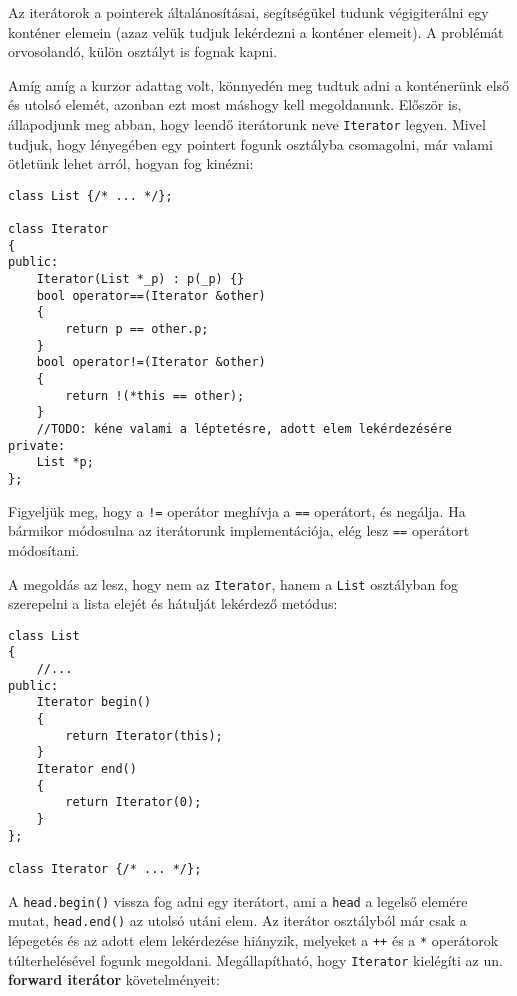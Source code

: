 \documentclass[../cpp_book/cpp_book.tex]{subfiles}
\begin{document}
	Az iterátorok a pointerek általánosításai, segítségükel tudunk végigiterálni egy konténer elemein (azaz velük tudjuk lekérdezni a konténer elemeit). A problémát orvosolandó, külön osztályt is fognak kapni.
	
	Amíg amíg a kurzor adattag volt, könnyedén meg tudtuk adni a konténerünk első és utolsó elemét, azonban ezt most máshogy kell megoldanunk. Először is, állapodjunk meg abban, hogy leendő iterátorunk neve \texttt{Iterator} legyen. Mivel tudjuk, hogy lényegében egy pointert fogunk osztályba csomagolni, már valami ötletünk lehet arról, hogyan fog kinézni:
	\begin{lstlisting}
class List {/* ... */};

class Iterator
{
public:
	Iterator(List *_p) : p(_p) {}
	bool operator==(Iterator &other)
	{
		return p == other.p;
	}
	bool operator!=(Iterator &other)
	{
		return !(*this == other);
	}
	//TODO: kéne valami a léptetésre, adott elem lekérdezésére
private:
	List *p;
};

	\end{lstlisting}
	\begin{note}
		Figyeljük meg, hogy a \texttt{!=} operátor meghívja a \texttt{==} operátort, és negálja. Ha bármikor módosulna az iterátorunk implementációja, elég lesz \texttt{==} operátort módosítani.
	\end{note}
	A megoldás az lesz, hogy nem az \texttt{Iterator}, hanem a \texttt{List} osztályban fog szerepelni a lista elejét és hátulját lekérdező metódus:
	\begin{lstlisting}
class List
{
	//...
public:
	Iterator begin()
	{
		return Iterator(this);
	}
	Iterator end()
	{
		return Iterator(0);
	}
};

class Iterator {/* ... */};
	\end{lstlisting}
	 A \texttt{head.begin()} vissza fog adni egy iterátort, ami a \texttt{head} a legelső elemére mutat, \texttt{head.end()} az utolsó utáni elem. Az iterátor osztályból már csak a lépegetés és az adott elem lekérdezése hiányzik, melyeket a \texttt{++} és a \texttt{*} operátorok túlterhelésével fogunk megoldani. Megállapítható, hogy \texttt{Iterator} kielégíti az un. \textbf{forward iterátor} követelményeit:
\end{document}
